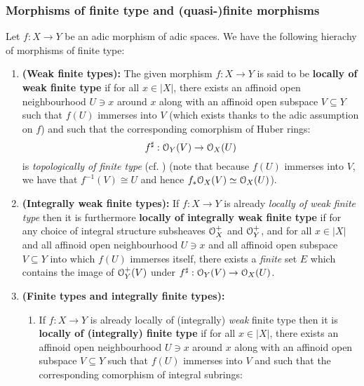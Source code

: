             \subsubsection{Morphisms of finite type and (quasi-)finite morphisms}
                \begin{definition} \label{def: finite_type_morphisms_between_adic_spaces}    
                    Let $f: X \to Y$ be an adic morphism of adic spaces. We have the following hierachy of morphisms of finite type:
                        \begin{enumerate}
                            \item \textbf{(Weak finite types):} The given morphism $f: X \to Y$ is said to be \textbf{locally of weak finite type} if for all $x \in |X|$, there exists an affinoid open neighbourhood $U \ni x$ around $x$ along with an affinoid open subspace $V \subseteq Y$ such that $f(U)$ immerses into $V$ (which exists thanks to the adic assumption on $f$) and such that the corresponding comorphism of Huber rings:
                                $$f^{\sharp}: \mathcal{O}_Y(V) \to \mathcal{O}_X(U)$$
                            is \textit{topologically of finite type} (cf. \cite[\href{https://stacks.math.columbia.edu/tag/0ANS}{Tag 0ANS}]{stacks}) (note that because $f(U)$ immerses into $V$, we have that $f^{-1}(V) \cong U$ and hence $f_*\mathcal{O}_X(V) \simeq \mathcal{O}_X(U)$). 
                            \item \textbf{(Integrally weak finite types):} If $f: X \to Y$ is already \textit{locally of weak finite type} then it is furthermore \textbf{locally of integrally weak finite type} if for any choice of integral structure subsheaves $\mathcal{O}_X^+$ and $\mathcal{O}_Y^+$, and for all $x \in |X|$ and all affinoid open neighbourhood $U \ni x$ and all affinoid open subspace $V \subseteq Y$ into which $f(U)$ immerses itself, there exists a \textit{finite} set $E$ which contains the image of $\mathcal{O}_Y^+(V)$ under $f^{\sharp}: \mathcal{O}_Y(V) \to \mathcal{O}_X(U)$. 
                            \item \textbf{(Finite types and integrally finite types):} 
                                \begin{enumerate}
                                    \item If $f: X \to Y$ is already locally of (integrally) \textit{weak} finite type then it is \textbf{locally of (integrally) finite type} if for all $x \in |X|$, there exists an affinoid open neighbourhood $U \ni x$ around $x$ along with an affinoid open subspace $V \subseteq Y$ such that $f(U)$ immerses into $V$ and such that the corresponding comorphism of integral subrings:

\end{enumerate}
\end{enumerate}
\end{definition}
